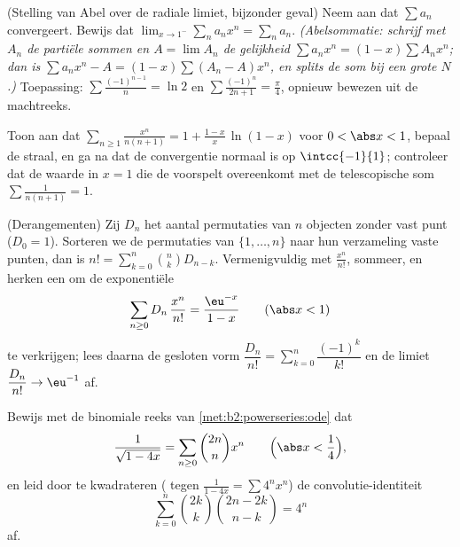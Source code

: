 \begin{exercise}[$\star\star\star$]\label{exo:b2:powerseries:9}
(Stelling van Abel over de radiale limiet, bijzonder geval) Neem
aan dat $\sum a_n$ convergeert. Bewijs dat $\lim_{x \to 1^-}
\sum_{n} a_n x^n = \sum_n a_n$. \emph{(Abelsommatie: schrijf met
$A_n$ de partiële sommen en $A = \lim A_n$ de gelijkheid $\sum
a_nx^n = (1 - x)\sum A_n x^n$; dan is $\sum a_nx^n - A = (1-x)\sum
(A_n - A)x^n$, en splits de som bij een grote $N$.)} Toepassing:
$\sum \frac{(-1)^{n-1}}{n} = \ln 2$ en $\sum \frac{(-1)^n}{2n+1} =
\frac\pi4$, opnieuw bewezen uit de machtreeks.
\end{exercise}

\begin{exercise}[$\star$]\label{exo:b2:powerseries:10}
Toon aan dat $\displaystyle\sum_{n\geq1}\frac{x^n}{n(n+1)} = 1 +
\frac{1-x}{x}\,\ln(1-x)$ voor $0 < \abs x < 1$, bepaal de straal,
en ga na dat de convergentie normaal is op $\intcc{-1}{1}$;
controleer dat de waarde in $x = 1$ die de  voorspelt
overeenkomt met de telescopische som $\sum \frac{1}{n(n+1)} = 1$.
\end{exercise}

\begin{exercise}[$\star\star$]\label{exo:b2:powerseries:11}
(Derangementen) Zij $D_n$ het aantal permutaties van $n$ objecten
zonder vast punt ($D_0 = 1$). Sorteren we de permutaties van $\{1,
\dots, n\}$ naar hun verzameling vaste punten, dan is $n! =
\sum_{k=0}^{n}\binom nk D_{n-k}$. Vermenigvuldig met
$\frac{x^n}{n!}$, sommeer, en herken een  om de
exponentiële 
\[
\sum_{n\geq0} D_n\,\frac{x^n}{n!} = \frac{\eu^{-x}}{1-x}
\qquad (\abs x < 1)
\]
te verkrijgen; lees daarna de gesloten vorm $\dfrac{D_n}{n!} =
\sum_{k=0}^{n}\dfrac{(-1)^k}{k!}$ en de limiet $\dfrac{D_n}{n!} \to
\eu^{-1}$ af.
\end{exercise}

\begin{exercise}[$\star\star\star$]\label{exo:b2:powerseries:12}
Bewijs met de binomiale reeks van
\cref{met:b2:powerseries:ode} dat
\[
\frac{1}{\sqrt{1 - 4x}} = \sum_{n\geq0}\binom{2n}{n}x^n
\qquad \Bigl(\abs x < \frac14\Bigr),
\]
en leid door te kwadrateren ( tegen
$\frac{1}{1-4x} = \sum 4^nx^n$) de convolutie-identiteit
\[
\sum_{k=0}^{n}\binom{2k}{k}\binom{2n-2k}{n-k} = 4^n
\]
af.
\end{exercise}

